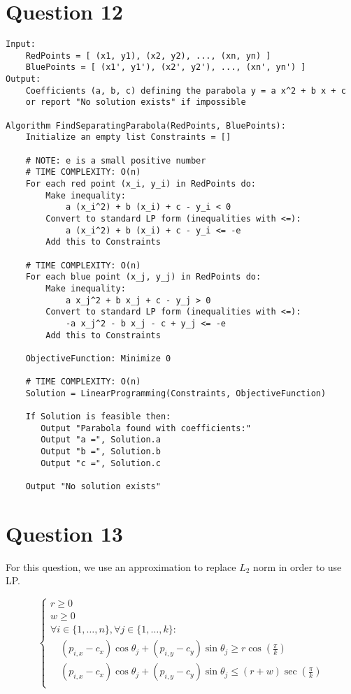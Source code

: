 \documentclass{article}
\begin{document}
\section*{Question 12}
\begin{verbatim}
Input: 
    RedPoints = [ (x1, y1), (x2, y2), ..., (xn, yn) ]
    BluePoints = [ (x1', y1'), (x2', y2'), ..., (xn', yn') ]
Output:
    Coefficients (a, b, c) defining the parabola y = a x^2 + b x + c
    or report "No solution exists" if impossible

Algorithm FindSeparatingParabola(RedPoints, BluePoints): 
    Initialize an empty list Constraints = []

    # NOTE: e is a small positive number
    # TIME COMPLEXITY: O(n)
    For each red point (x_i, y_i) in RedPoints do:
        Make inequality:
            a (x_i^2) + b (x_i) + c - y_i < 0
        Convert to standard LP form (inequalities with <=):
            a (x_i^2) + b (x_i) + c - y_i <= -e
        Add this to Constraints

    # TIME COMPLEXITY: O(n)
    For each blue point (x_j, y_j) in RedPoints do:
        Make inequality:
            a x_j^2 + b x_j + c - y_j > 0
        Convert to standard LP form (inequalities with <=):
            -a x_j^2 - b x_j - c + y_j <= -e
        Add this to Constraints

    ObjectiveFunction: Minimize 0

    # TIME COMPLEXITY: O(n)
    Solution = LinearProgramming(Constraints, ObjectiveFunction)

    If Solution is feasible then:
       Output "Parabola found with coefficients:"
       Output "a =", Solution.a
       Output "b =", Solution.b
       Output "c =", Solution.c

    Output "No solution exists"
\end{verbatim}

\newpage

\section*{Question 13}
For this question, we use an approximation to replace $L_2$ norm in order to use LP.

\[
    \begin{cases}
        r \geq 0 \\
        w \geq 0 \\
        \forall i \in \{1, \ldots, n\}, \forall j \in \{1, \ldots, k\}: \\
        \quad (p_{i,x} - c_x) \cos \theta_j + (p_{i,y} - c_y) \sin \theta_j \geq r \cos\left(\frac{\pi}{k}\right) \\
        \quad (p_{i,x} - c_x) \cos \theta_j + (p_{i,y} - c_y) \sin \theta_j \leq (r + w) \sec\left(\frac{\pi}{k}\right) \\
    \end{cases}
\]
\end{document}
